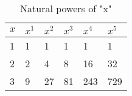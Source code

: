 \begin{table}[h]
    \centering
    \begin{tabular}{|l|l|l|l|l|l|}
        \hline
            $x$ & $x^1$ & $x^2$ & $x^3$ & $x^4$ & $x^5$ \\ \hline \hline
            1 & 1 & 1 & 1 & 1 & 1 \\ \hline
            2 & 2 & 4 & 8 & 16 & 32 \\ \hline
            3 & 9 & 27 & 81 & 243 & 729 \\ \hline
    \end{tabular}
    \caption{Natural powers of "x"}
    \label{tab::powers}
\end{table}